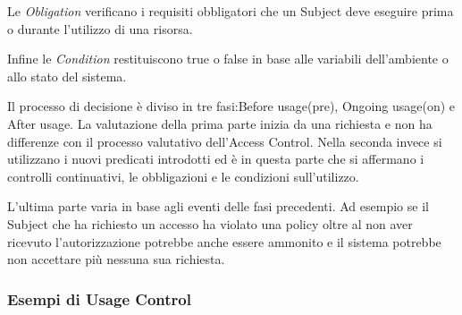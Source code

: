 Le \emph{Obligation} verificano i requisiti obbligatori che un Subject deve eseguire prima o durante l'utilizzo di una risorsa.\par
Infine le \emph{Condition} restituiscono true o false in base alle variabili dell'ambiente o allo stato del sistema.\par
Il processo di decisione è diviso in tre fasi\cite{SurveyUsageControl}:Before usage(pre), Ongoing usage(on) e After usage.
La valutazione della prima parte inizia da una richiesta e non ha differenze con il processo valutativo dell'Access Control.
Nella seconda invece si utilizzano i nuovi predicati introdotti ed è in questa parte che si affermano i controlli continuativi,
le obbligazioni e le condizioni sull'utilizzo.\par
L'ultima parte varia in base agli eventi delle fasi precedenti. Ad esempio se il Subject che ha richiesto un accesso ha violato
una policy oltre al non aver ricevuto l'autorizzazione potrebbe anche essere ammonito e il sistema potrebbe non accettare più
nessuna sua richiesta.

\subsubsection{Esempi di Usage Control}
\label{subs:Esempi}
